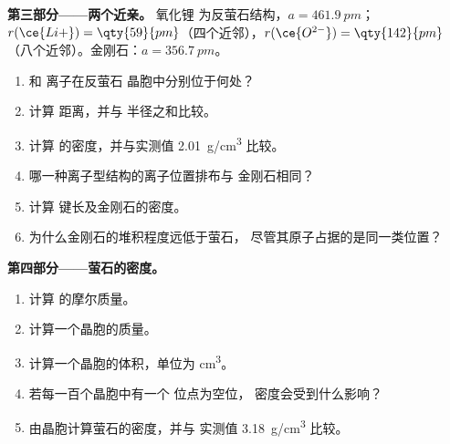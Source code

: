 \begin{problem}
\medskip
\noindent\textbf{第三部分——两个近亲。}
氧化锂  为反萤石结构，$a = \qty{461.9}{pm}$；
$r(\ce{Li+}) = \qty{59}{pm}$（四个近邻），$r(\ce{O^{2-}}) =
\qty{142}{pm}$（八个近邻）。金刚石：$a = \qty{356.7}{pm}$。
\begin{enumerate}[resume]
  \item {} 和  离子在反萤石
        晶胞中分别位于何处？
  \item 计算  距离，并与
        半径之和比较。
  \item 计算  的密度，并与实测值
        \qty{2.01}{g/cm^3} 比较。
  \item 哪一种离子型结构的离子位置排布与
        金刚石相同？
  \item 计算  键长及金刚石的密度。
  \item 为什么金刚石的堆积程度远低于萤石，
        尽管其原子占据的是同一类位置？
\end{enumerate}

\medskip
\noindent\textbf{第四部分——萤石的密度。}
\begin{enumerate}[resume]
  \item 计算  的摩尔质量。
  \item 计算一个晶胞的质量。
  \item 计算一个晶胞的体积，单位为 \unit{cm^3}。
  \item 若每一百个晶胞中有一个  位点为空位，
        密度会受到什么影响？
  \item 由晶胞计算萤石的密度，并与
        实测值 \qty{3.18}{g/cm^3} 比较。
\end{enumerate}
\end{problem}
